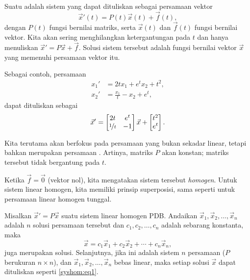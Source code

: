 Suatu \emph{} adalah sistem yang dapat
dituliskan sebagai persamaan vektor
\begin{equation*}
{\vec{x}}'(t) = P(t)\vec{x}(t) + \vec{f}(t),
\end{equation*}
dengan $P(t)$ fungsi bernilai matriks,
serta $\vec{x}(t)$ dan $\vec{f}(t)$ fungsi bernilai vektor.
Kita akan sering menghilangkan ketergantungan pada $t$ dan
hanya menuliskan ${\vec{x}}' = P\vec{x} + \vec{f}$.  Solusi
sistem tersebut adalah fungsi bernilai vektor
$\vec{x}$ yang memenuhi persamaan vektor itu.

Sebagai contoh, persamaan
\begin{equation*}
\begin{aligned}
x_1' &= 2t x_1 + e^t x_2 + t^2 , \\
x_2' &= \frac{x_1}{t} -x_2 + e^t ,
\end{aligned}
\end{equation*}
dapat dituliskan sebagai
\begin{equation*}
{\vec{x}}' =
\begin{bmatrix}
2t & e^t \\
\nicefrac{1}{t} & -1
\end{bmatrix}
\vec{x}
+
\begin{bmatrix}
t^2 \\
e^t
\end{bmatrix} .
\end{equation*}

Kita terutama akan berfokus pada persamaan yang bukan sekadar linear, tetapi
bahkan merupakan persamaan \emph{}.  Artinya, matriks $P$
akan konstan; matriks tersebut tidak bergantung pada $t$.

\medskip

Ketika $\vec{f} = \vec{0}$ (vektor nol), kita mengatakan sistem tersebut
\emph{homogen}.
Untuk sistem linear homogen, kita memiliki
prinsip superposisi, sama seperti untuk persamaan linear homogen tunggal.

\begin{theorem}[Superposisi]
Misalkan
${\vec{x}}' = P\vec{x}$ suatu sistem linear homogen PDB.  Andaikan
$\vec{x}_1,\vec{x}_2,\ldots,\vec{x}_n$ adalah $n$ solusi persamaan tersebut
dan $c_1,c_2,\ldots,c_n$ adalah sebarang konstanta, maka
\begin{equation} \label{syshom:eq1}
\vec{x} = c_1 \vec{x}_1 + c_2 \vec{x}_2 + \cdots + c_n \vec{x}_n ,
\end{equation}
juga merupakan solusi.
Selanjutnya, jika ini adalah sistem $n$ persamaan ($P$ berukuran $n\times n$), dan
$\vec{x}_1,\vec{x}_2,\ldots,\vec{x}_n$ bebas linear, maka setiap
solusi $\vec{x}$ dapat dituliskan seperti \eqref{syshom:eq1}.
\end{theorem}

